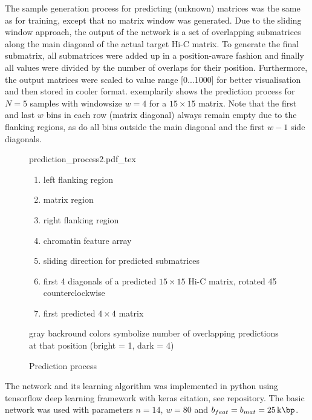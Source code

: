The sample generation process for predicting (unknown) matrices was the same as for training,
except that no matrix window was generated.
Due to the sliding window approach, the output of the network is a set of overlapping submatrices along the main diagonal of the actual target Hi-C matrix.
To generate the final submatrix, all submatrices were added up in a position-aware fashion 
and finally all values were divided by the number of overlaps for their position.
Furthermore, the output matrices were scaled to value range [0...1000] for better visualisation and then stored in cooler format.
 exemplarily shows the prediction process for $N=5$ samples with windowsize $w=4$ for a $15\times15$ matrix.
Note that the first and last $w$ bins in each row (matrix diagonal) always remain empty due to the flanking regions,
as do all bins outside the main diagonal and the first $w-1$ side diagonals.
\begin{figure}
 \begin{minipage}{0.60\textwidth}
   \centering
    \small
    {prediction_process2.pdf_tex}
    \caption{Prediction process}
    \label{fig:methods:prediction}
 \end{minipage}\hfill
 \begin{minipage}{0.3\textwidth}
 \scriptsize
  \begin{enumerate}[label=\Alph*:,leftmargin=*]
   \raggedright
    \item left flanking region
    \item matrix region
    \item right flanking region
    \item chromatin feature array
    \item sliding direction for predicted submatrices
    \item first 4 diagonals of a predicted $15\times15$ Hi-C matrix, rotated \SI{45}{\deg} counterclockwise
    \item first predicted $4\times4$ matrix
\end{enumerate}
\raggedright{gray backround colors symbolize number of overlapping predictions at that position (bright = 1, dark = 4)}
 \end{minipage}
\end{figure}

The network and its learning algorithm was implemented in python using tensorflow deep learning framework with keras \xxx citation, see \xxx repository.
The basic network was used with parameters $n=14$, $w=80$ and $b_{feat}=b_{mat} = \SI{25}{\kilo\bp}$. 

